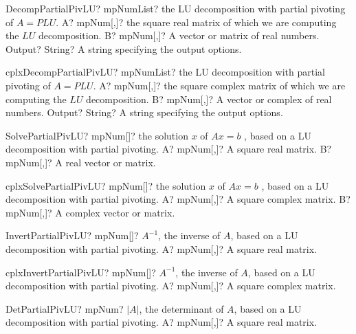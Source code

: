 \documentclass[12pt,a4paper,openany]{book}
\begin{document}
\begin{mpFunctionsExtract}
\mpFunctionThree
{DecompPartialPivLU? mpNumList? the LU decomposition with partial pivoting of $A = PLU$.}
{A? mpNum[,]? the square real matrix of which we are computing the $LU$ decomposition.}
{B? mpNum[,]? A vector or matrix of real numbers.}
{Output? String? A string specifying the output options.}
\end{mpFunctionsExtract}

\begin{mpFunctionsExtract}
\mpFunctionThree
{cplxDecompPartialPivLU? mpNumList? the LU decomposition with partial pivoting of $A = PLU$.}
{A? mpNum[,]? the square complex matrix of which we are computing the $LU$ decomposition.}
{B? mpNum[,]? A vector or complex of real numbers.}
{Output? String? A string specifying the output options.}
\end{mpFunctionsExtract}

\begin{mpFunctionsExtract}
\mpFunctionTwo
{SolvePartialPivLU? mpNum[]? the solution $x$ of $A x = b$ , based on a LU decomposition with partial pivoting.}
{A? mpNum[,]? A square real matrix.}
{B? mpNum[,]? A real vector or matrix.}
\end{mpFunctionsExtract}

\begin{mpFunctionsExtract}
\mpFunctionTwo
{cplxSolvePartialPivLU? mpNum[]? the solution $x$ of $A x = b$ , based on a LU decomposition with partial pivoting.}
{A? mpNum[,]? A square complex matrix.}
{B? mpNum[,]? A complex vector or matrix.}
\end{mpFunctionsExtract}

\begin{mpFunctionsExtract}
\mpFunctionOne
{InvertPartialPivLU? mpNum[]? $A^{-1}$, the inverse of $A$, based on a LU decomposition with partial pivoting.}
{A? mpNum[,]? A square real matrix.}
\end{mpFunctionsExtract}

\begin{mpFunctionsExtract}
\mpFunctionOne
{cplxInvertPartialPivLU? mpNum[]? $A^{-1}$, the inverse of $A$, based on a LU decomposition with partial pivoting.}
{A? mpNum[,]? A square complex matrix.}
\end{mpFunctionsExtract}

\begin{mpFunctionsExtract}
\mpFunctionOne
{DetPartialPivLU? mpNum? $|A|$, the determinant of $A$, based on a LU decomposition with partial pivoting.}
{A? mpNum[,]? A square real matrix.}
\end{mpFunctionsExtract}
\end{document}
